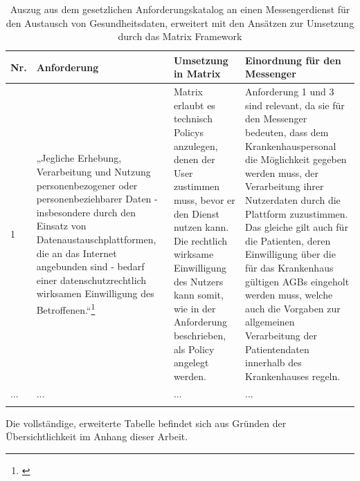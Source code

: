 \begin{longtable}{p{0.6cm}|p{4cm}|p{5cm}|p{5cm}}
    \hline
Nr. & Anforderung                                                                                                                                                                                                                                                                                          & Umsetzung in Matrix          & Einordnung für den Messenger                                                                                                                                                                                                                                                                                                                                                                                                                                                                                                                                        \\ \hline
1 &
  „Jegliche Erhebung, Verarbeitung und Nutzung personenbezogener oder personenbeziehbarer Daten - insbesondere durch den Einsatz von Datenaustauschplattformen, die an das Internet angebunden sind - bedarf einer datenschutzrechtlich wirksamen Einwilligung des Betroffenen.“\footnote{\cite[S. 41]{Bundesverband-Gesundheits-IT-e.V.2016}} &
  Matrix erlaubt es technisch Policys anzulegen, denen der User zustimmen muss, bevor er den Dienst nutzen kann. Die rechtlich wirksame Einwilligung des Nutzers kann somit, wie in der Anforderung beschrieben, als Policy angelegt werden. &
  Anforderung 1 und 3 sind relevant, da sie für den Messenger bedeuten, dass dem Krankenhauspersonal die Möglichkeit gegeben werden muss, der Verarbeitung ihrer Nutzerdaten durch die Plattform zuzustimmen. Das gleiche gilt auch für die Patienten, deren Einwilligung über die für das Krankenhaus gültigen AGBs eingeholt werden muss, welche auch die Vorgaben zur allgemeinen Verarbeitung der Patientendaten innerhalb des Krankenhauses regeln.
  \\ \hline
... &
... &
... &
...
  \\ \hline

\caption{Auszug aus dem gesetzlichen Anforderungskatalog an einen Messengerdienst für den Austausch von Gesundheitsdaten, erweitert mit den Ansätzen zur Umsetzung durch das Matrix Framework} 
\end{longtable}

Die vollständige, erweiterte Tabelle befindet sich aus Gründen der Übersichtlichkeit im Anhang dieser Arbeit.

